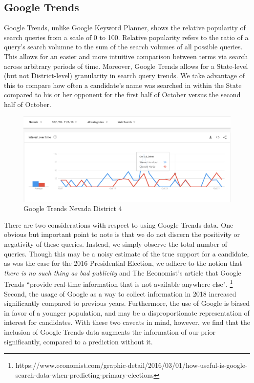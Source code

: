 \documentclass[11pt]{article}
\begin{document}
\subsection{Google Trends}
Google Trends, unlike Google Keyword Planner, shows the relative popularity of search queries from a scale of 0 to 100. Relative popularity refers to the ratio of a query's search volumne to the sum of the search volumes of all possible queries. This allows for an easier and more intuitive comparison between terms via search across arbitrary periods of time. Moreover, Google Trends allows for a State-level (but not District-level) granularity in search query trends. We take advantage of this to compare how often a candidate's name was searched in within the State compared to his or her opponent for the first half of October versus the second half of October.

 \begin{figure}[tbh]
  \centering
  \includegraphics[scale=0.4]{google_trends_ex}
  \caption{Google Trends Nevada District 4}
  \label{fig:Google Trends}
\end{figure}

There are two considerations with respect to using Google Trends data. One obvious but important point to note is that we do not discern the positivity or negativity of these queries. Instead, we simply observe the total number of queries. Though this may be a noisy estimate of the true support for a candidate, as was the case for the 2016 Presidential Election, we adhere to the notion that \textit{there is no such thing as bad publicity} and The Economist's article that Google Trends ``provide real-time information that is not available anywhere else". \footnote{https://www.economist.com/graphic-detail/2016/03/01/how-useful-is-google-search-data-when-predicting-primary-elections} Second, the usage of Google as a way to collect information in 2018 increased significantly compared to previous years. Furthermore, the use of Google is biased in favor of a younger population, and may be a disproportionate representation of interest for candidates. With these two caveats in mind, however, we find that the inclusion of Google Trends data augments the information of our prior significantly, compared to a prediction without it.
\end{document}
